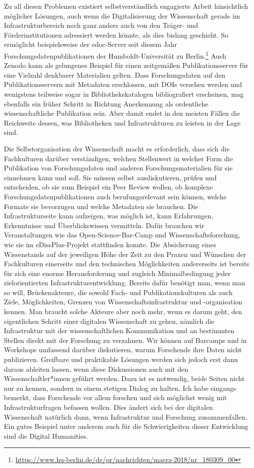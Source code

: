 \documentclass[a4paper,
fontsize=11pt,
oneside,
numbers=noperiodatend,
parskip=half-,
bibliography=totoc,
final
]{scrartcl}
\begin{document}
Zu all diesen Problemen existiert selbstverständlich engagierte Arbeit
hinsichtlich möglicher Lösungen, auch wenn die Digitalisierung der
Wissenschaft gerade im Infrastrukturbereich noch ganz anders auch von
den Träger- und Förderinstitutionen adressiert werden könnte, als dies
bislang geschieht. So ermöglicht beispielsweise der edoc-Server seit
diesem Jahr Forschungsdatenpublikationen der Humboldt-Universität zu
Berlin.\footnote{\url{https://www.hu-berlin.de/de/pr/nachrichten/maerz-2018/nr_180309_00}}
Auch Zenodo kann als gelungenes Beispiel für einen zeitgemäßen
Publikationsserver für eine Vielzahl denkbarer Materialien gelten. Dass
Forschungsdaten auf den Publikationsservern mit Metadaten erschlossen,
mit DOIs versehen werden und wenigstens teilweise sogar in
Bibliothekskatalogen bibliografiert erscheinen, mag ebenfalls ein früher
Schritt in Richtung Anerkennung als ordentliche wissenschaftliche
Publikation sein. Aber damit endet in den meisten Fällen die Reichweite
dessen, was Bibliotheken und Infrastrukturen zu leisten in der Lage
sind.

Die Selbstorganisation der Wissenschaft macht es erforderlich, dass sich
die Fachkulturen darüber verständigen, welchen Stellenwert in welcher
Form die Publikation von Forschungsdaten und anderen
Forschungsmaterialien für sie einnehmen kann und soll. Sie müssen selbst
ausdiskutieren, prüfen und entscheiden, ob sie zum Beispiel ein Peer
Review wollen, ob komplexe Forschungsdatenpublikationen auch
berufungsrelevant sein können, welche Formate sie bevorzugen und welche
Metadaten sie brauchen. Die Infrastrukturseite kann aufzeigen, was
möglich ist, kann Erfahrungen, Erkenntnisse und Überblickswissen
vermitteln. Dafür brauchen wir Veranstaltungen wie das
Open-Science-Bar-Camp und Wissenschaftsforschung, wie sie im
eDissPlus-Projekt stattfinden konnte. Die Absicherung eines Wissenstands
auf der jeweiligen Höhe der Zeit zu den Praxen und Wünschen der
Fachkulturen einerseits und den technischen Möglichkeiten andererseits
ist bereits für sich eine enorme Herausforderung und zugleich
Minimalbedingung jeder zielorientierten Infrastrukturentwicklung.
Bereits dafür benötigt man, wenn man so will, Brückenakteure, die sowohl
Fach- und Publikationskulturen als auch Ziele, Möglichkeiten, Grenzen
von Wissenschaftsinfrastruktur und -organisation kennen. Man braucht
solche Akteure aber noch mehr, wenn es darum geht, den eigentlichen
Schritt einer digitalen Wissenschaft zu gehen, nämlich die Infrastruktur
mit der wissenschaftlichen Kommunikation und an bestimmten Stellen
direkt mit der Forschung zu verzahnen. Wir können auf Barcamps und in
Workshops umfassend darüber diskutieren, warum Forschende ihre Daten
nicht publizieren. Greifbare und praktikable Lösungen werden sich jedoch
erst dann daraus ableiten lassen, wenn diese Diskussionen auch mit den
Wissenschaftler*innen geführt werden. Dazu ist es notwendig, beide
Seiten nicht nur zu kennen, sondern in einem stetigen Dialog zu halten.
Ich habe eingangs bemerkt, dass Forschende vor allem forschen und sich
möglichst wenig mit Infrastrukturfragen befassen wollen. Dies ändert
sich bei der digitalen Wissenschaft natürlich dann, wenn Infrastruktur
und Forschung zusammenfallen. Ein gutes Beispiel unter anderem auch für
die Schwierigkeiten dieser Entwicklung sind die Digital Humanities.
\end{document}
